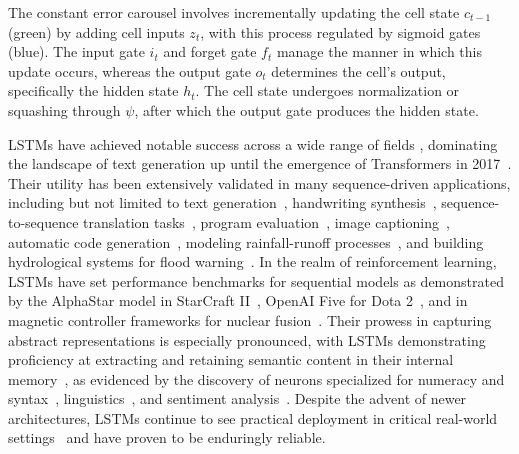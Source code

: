 The constant error carousel involves incrementally updating the cell state $c_{t-1}$ (green) by adding cell inputs $z_t$, with this process regulated by sigmoid gates (blue). The input gate $i_t$ and forget gate $f_t$ manage the manner in which this update occurs, whereas the output gate $o_t$ determines the cell’s output, specifically the hidden state $h_t$. The cell state undergoes normalization or squashing through $\psi$, after which the output gate produces the hidden state.

LSTMs have achieved notable success across a wide range of fields \citep{Hochreiter:01,Hochreiter:07,Schmidhuber:15}, dominating the landscape of text generation up until the emergence of Transformers in 2017~\citep{Vaswani:17}. Their utility has been extensively validated in many sequence-driven applications, including but not limited to text generation~\citep{Graves:13,Karpathy:15blog}, handwriting synthesis~\citep{Graves:13}, sequence-to-sequence translation tasks~\citep{Sutskever:14nips}, program evaluation~\citep{Zaremba:14arxiv}, image captioning~\citep{Karpathy:15,Hossain:19}, automatic code generation~\citep{Karpathy:15blog}, modeling rainfall-runoff processes~\citep{Kratzert:18,Kratzert:19}, and building hydrological systems for flood warning~\citep{Nearing:24}. In the realm of reinforcement learning, LSTMs have set performance benchmarks for sequential models as demonstrated by the AlphaStar model in StarCraft II~\citep{Vinyals:17short}, OpenAI Five for Dota 2~\citep{OpenAI:19}, and in magnetic controller frameworks for nuclear fusion~\citep{Degrave:22short}. Their prowess in capturing abstract representations is especially pronounced, with LSTMs demonstrating proficiency at extracting and retaining semantic content in their internal memory~\citep{Karpathy:15blog}, as evidenced by the discovery of neurons specialized for numeracy and syntax~\citep{Lakretz:19}, linguistics~\citep{Bau:19}, and sentiment analysis~\citep{Radford:17arxiv}. Despite the advent of newer architectures, LSTMs continue to see practical deployment in critical real-world settings~\citep{Degrave:22short,Nearing:24} and have proven to be enduringly reliable.

